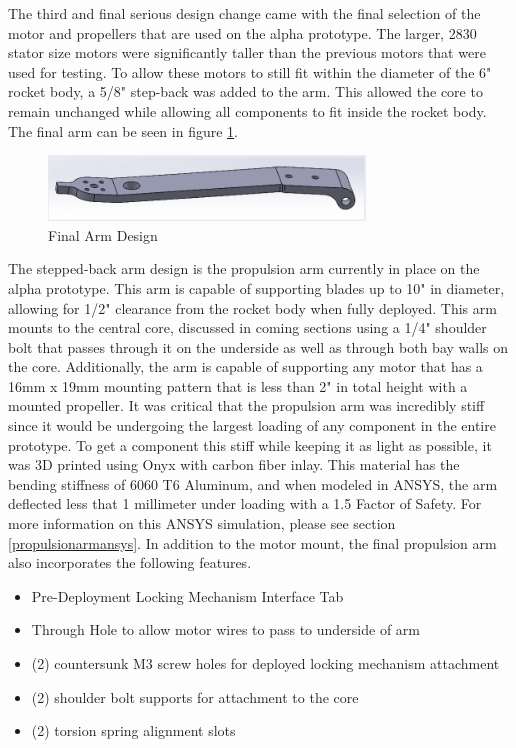 The third and final serious design change came with the final selection of the motor and propellers that are used on the alpha prototype. The larger, 2830 stator size motors were significantly taller than the previous motors that were used for testing. To allow these motors to still fit within the diameter of the 6" rocket body, a 5/8" step-back was added to the arm. This allowed the core to remain unchanged while allowing all components to fit inside the rocket body. The final arm can be seen in figure \ref{fig:newarm}.

\begin{figure}
    \centering
    \includegraphics[width=0.75\textwidth]{src/figs/finalarm.png}
    \caption{Final Arm Design}
    \label{fig:newarm}
\end{figure}

The stepped-back arm design is the propulsion arm currently in place on the alpha prototype. This arm is capable of supporting blades up to 10" in diameter, allowing for 1/2" clearance from the rocket body when fully deployed. This arm mounts to the central core, discussed in coming sections using a 1/4" shoulder bolt that passes through it on the underside as well as through both bay walls on the core. Additionally, the arm is capable of supporting any motor that has a 16mm x 19mm mounting pattern that is less than 2" in total height with a mounted propeller. It was critical that the propulsion arm was incredibly stiff since it would be undergoing the largest loading of any component in the entire prototype. To get a component this stiff while keeping it as light as possible, it was 3D printed using Onyx with carbon fiber inlay. This material has the bending stiffness of 6060 T6 Aluminum, and when modeled in ANSYS, the arm deflected less that 1 millimeter under loading with a 1.5 Factor of Safety. For more information on this ANSYS simulation, please see section \ref{propulsionarmansys}. In addition to the motor mount, the final propulsion arm also incorporates the following features.

\begin{itemize}
    \item Pre-Deployment Locking Mechanism Interface Tab
    \item Through Hole to allow motor wires to pass to underside of arm
    \item (2) countersunk M3 screw holes for deployed locking mechanism attachment
    \item (2) shoulder bolt supports for attachment to the core
    \item (2) torsion spring alignment slots
\end{itemize}

